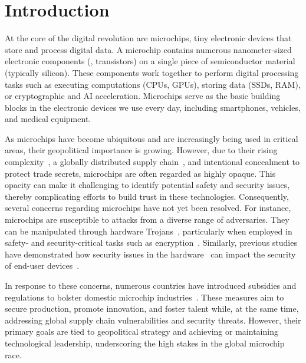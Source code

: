 \section{Introduction}
\label{xhw_study::sec::introduction}

At the core of the digital revolution are microchips, tiny electronic devices that store and process digital data.
A microchip contains numerous nanometer-sized electronic components (\eg, transistors) on a single piece of semiconductor material (typically silicon). 
These components work together to perform digital processing tasks such as executing computations (\acsp{CPU}, \acsp{GPU}), storing data (\acsp{SSD}, \acs{RAM}), or cryptographic and \acs{AI} acceleration.
Microchips serve as the basic building blocks in the electronic devices we use every day, including smartphones, vehicles, and medical equipment.

As microchips have become ubiquitous and are increasingly being used in critical areas, their geopolitical importance is growing. 
However, due to their rising complexity~\cite{Burrell2016How, DBLP:conf/re/MannCKSS23,apple2022m1ultra}, a globally distributed supply chain~\cite{weste2015cmos,lienig2020fundamentals}, and intentional concealment to protect trade secrets, microchips are often regarded as highly opaque.
This opacity can make it challenging to identify potential safety and security issues, thereby complicating efforts to build trust in these technologies.
Consequently, several concerns regarding microchips have not yet been resolved.
For instance, microchips are susceptible to attacks from a diverse range of adversaries. 
They can be manipulated through hardware Trojans~\cite{Adee2008Hunt}, particularly when employed in safety- and security-critical tasks such as encryption~\cite{DBLP:conf/crypto/KocherJJ99, DBLP:conf/host/DaRoltNFR11}. 
Similarly, previous studies have demonstrated how security issues in the hardware~\cite{Adee2008Hunt,Becker2013Stealthy,Lipp2018Meltdown} can impact the security of end-user devices~\cite{CVE-2023-38606}. 

In response to these concerns, numerous countries have introduced subsidies and regulations to bolster domestic microchip industries~\cite{uschips2022, euchips2022}.
These measures aim to secure production, promote innovation, and foster talent while, at the same time, addressing global supply chain vulnerabilities and security threats.
However, their primary goals are tied to geopolitical strategy and achieving or maintaining technological leadership, underscoring the high stakes in the global microchip race.

